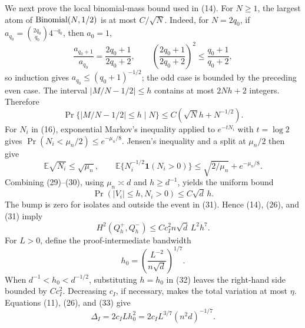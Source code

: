 We next prove the local binomial-mass bound used in (14).  For \(N\geq1\), the largest atom of \({\rm Binomial}(N,1/2)\) is at most \(C/\sqrt N\).  Indeed, for \(N=2q_0\), if \(a_{q_0}={2q_0\choose q_0}4^{-q_0}\), then \(a_0=1\),
\[
 \frac{a_{q_0+1}}{a_{q_0}}=\frac{2q_0+1}{2q_0+2},
 \qquad
 \left(\frac{2q_0+1}{2q_0+2}\right)^2\leq\frac{q_0+1}{q_0+2},
\tag{28}
\]
so induction gives \(a_{q_0}\leq(q_0+1)^{-1/2}\); the odd case is bounded by the preceding even case.  The interval \(|M/N-1/2|\leq h\) contains at most \(2Nh+2\) integers.  Therefore
\[
 \Pr\{|M/N-1/2|\leq h\mid N\}
 \leq C(\sqrt N h+N^{-1/2}).
\tag{29}
\]
For \(N_i\) in (16), exponential Markov's inequality applied to \(e^{-tN_i}\) with \(t=\log2\) gives \(\Pr(N_i<\mu_n/2)\leq e^{-\mu_n/8}\).  Jensen's inequality and a split at \(\mu_n/2\) then give
\[
 \mathbb E\sqrt{N_i}\leq\sqrt{\mu_n},
 \qquad
 \mathbb E\{N_i^{-1/2}\mathbf 1(N_i>0)\}
 \leq\sqrt{2/\mu_n}+e^{-\mu_n/8}.
\tag{30}
\]
Combining (29)--(30), using \(\mu_n\asymp d\) and \(h\geq d^{-1}\), yields the uniform bound
\[
 \Pr(|V_i|\leq h,N_i>0)\leq C\sqrt d\,h.
\tag{31}
\]
The bump is zero for isolates and outside the event in (31).  Hence (14), (26), and (31) imply
\[
 H^2(Q_h^+,Q_h^-)
 \leq Cc_I^2n\sqrt d\,L^2h^7.
\tag{32}
\]
For \(L>0\), define the proof-intermediate bandwidth
\[
 h_0=\left(\frac{L^{-2}}{n\sqrt d}\right)^{1/7}.
\tag{33}
\]
When \(d^{-1}<h_0<d^{-1/2}\), substituting \(h=h_0\) in (32) leaves the right-hand side bounded by \(Cc_I^2\).  Decreasing \(c_I\), if necessary, makes the total variation at most \(\eta\).  Equations (11), (26), and (33) give
\[
 \Delta_I=2c_ILh_0^2
 =2c_IL^{3/7}(n^2d)^{-1/7}.
\tag{34}
\]

